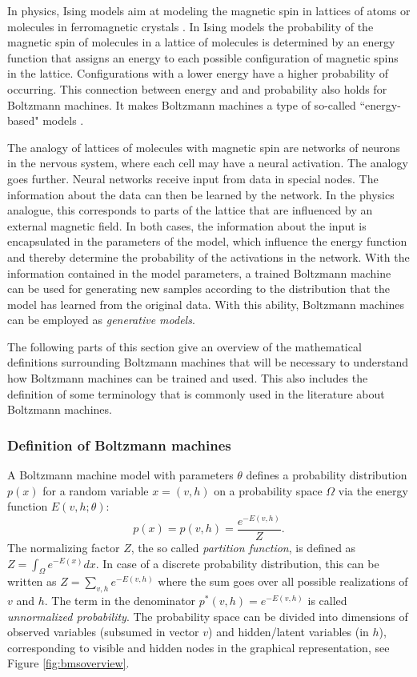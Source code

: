 \documentclass[12pt]{article}
\begin{document}
In physics, Ising models aim at modeling the magnetic spin in lattices of atoms or molecules in ferromagnetic crystals \citep{isingmodel}.
In Ising models the probability of the magnetic spin of molecules in a lattice of molecules is determined by an energy function that assigns an energy to each possible configuration of magnetic spins in the lattice.
Configurations with a lower energy have a higher probability of occurring.
This connection between energy and and probability also holds for Boltzmann machines.
It makes Boltzmann machines a type of so-called ``energy-based" models \citep{ranzato_ebm}.

The analogy of lattices of molecules with magnetic spin are networks of neurons in the nervous system, where each cell may have a neural activation.
The analogy goes further.
Neural networks receive input from data in special nodes.
The information about the data can then be learned by the network.
In the physics analogue, this corresponds to parts of the lattice that are influenced by an external magnetic field.
In both cases, the information about the input is encapsulated in the parameters of the model, which influence the energy function and thereby determine the probability of the activations in the network.
With the information contained in the model parameters, a trained Boltzmann machine can be used for generating new samples according to the distribution that the model has learned from the original data.
With this ability, Boltzmann machines can be employed as {\em generative models}.

The following parts of this section give an overview of the mathematical definitions surrounding Boltzmann machines that will be necessary to understand how Boltzmann machines can be trained and used.
This also includes the definition of some terminology that is commonly used in the literature about Boltzmann machines.

\subsubsection{Definition of Boltzmann machines}\label{basicbmproperties}

A Boltzmann machine model with parameters $\theta$ defines a probability distribution $p(x)$ for a random variable $x = (v, h)$ on a probability space $\Omega$ via the energy function $E(v, h; \theta)$:
\begin{equation}
   p(x) = p(v, h) = \frac{e^{-E(v,h)}}{Z}.
   \label{eqn:probbm}
\end{equation}
The normalizing factor $Z$, the so called \emph{partition function}, is defined as $Z = \int_{\Omega} e^{-E(x)} dx$.
In case of a discrete probability distribution, this can be written as $Z = \sum_{v,h}e^{-E(v,h)}$ where the sum goes over all possible realizations of $v$ and $h$.
The term in the denominator $p^*(v,h) = e^{-E(v,h)}$ is called \emph{unnormalized probability}.
The probability space can be divided into dimensions of observed variables (subsumed in vector $v$) and hidden/latent variables (in $h$), corresponding to visible and hidden nodes in the graphical representation, see Figure \ref{fig:bmsoverview}.
\end{document}
